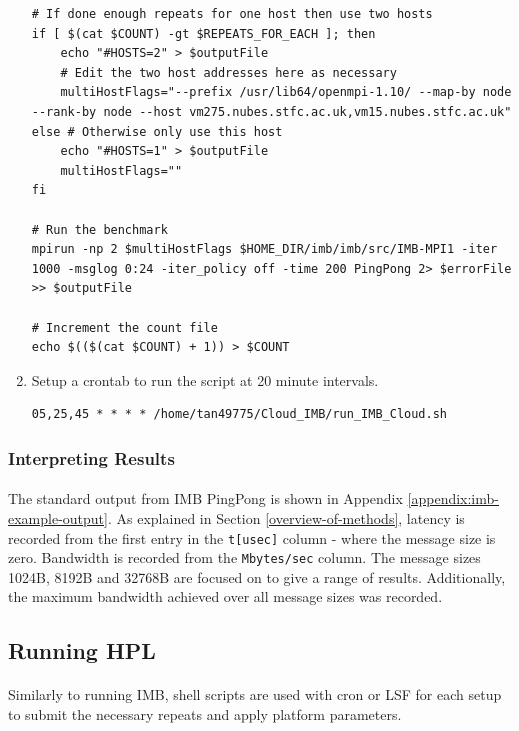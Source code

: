 \documentclass{article}
\newenvironment{code}{\captionsetup{type=listing}}{}
\begin{document}
\begin{enumerate}
\begin{code}
\begin{verbatim}
# If done enough repeats for one host then use two hosts
if [ $(cat $COUNT) -gt $REPEATS_FOR_EACH ]; then
    echo "#HOSTS=2" > $outputFile
    # Edit the two host addresses here as necessary
    multiHostFlags="--prefix /usr/lib64/openmpi-1.10/ --map-by node  --rank-by node --host vm275.nubes.stfc.ac.uk,vm15.nubes.stfc.ac.uk"
else # Otherwise only use this host
    echo "#HOSTS=1" > $outputFile
    multiHostFlags=""
fi

# Run the benchmark
mpirun -np 2 $multiHostFlags $HOME_DIR/imb/imb/src/IMB-MPI1 -iter 1000 -msglog 0:24 -iter_policy off -time 200 PingPong 2> $errorFile >> $outputFile

# Increment the count file
echo $(($(cat $COUNT) + 1)) > $COUNT
                    \end{verbatim}
                    \end{code}
                \item Setup a crontab to run the script at 20 minute intervals.

                    \begin{verbatim}
05,25,45 * * * * /home/tan49775/Cloud_IMB/run_IMB_Cloud.sh
                    \end{verbatim}
            \end{enumerate}

        \subsubsection{Interpreting Results}
            \paragraph{}
            The standard output from IMB PingPong is shown in Appendix \ref{appendix:imb-example-output}. As explained in Section \ref{overview-of-methods}, latency is recorded from the first entry in the \verb|t[usec]| column - where the message size is zero. Bandwidth is recorded from the \verb|Mbytes/sec| column. The message sizes 1024B, 8192B and 32768B are focused on to give a range of results. Additionally, the maximum bandwidth achieved over all message sizes was recorded.


    \subsection{Running HPL}
        \paragraph{}
        Similarly to running IMB, shell scripts are used with cron or LSF for each setup to submit the necessary repeats and apply platform parameters.
\end{document}
